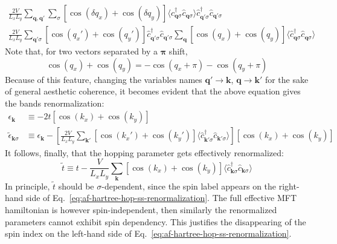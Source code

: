 \begin{multline}
	\frac{2V}{L_x L_y} \sum_{\mathbf{q}, \mathbf{q}'} \sum_\sigma \left[
		\cos \left( \delta q_x \right) + \cos \left( \delta q_y \right)	
	\right] \langle
		\hat c_{\mathbf{q}\sigma}^\dagger  \hat c_{\mathbf{q}\sigma}
	\rangle
	\hat c_{\mathbf{q}'\sigma}^\dagger  \hat c_{\mathbf{q}'\sigma} \\
	\frac{2V}{L_x L_y} \sum_{\mathbf{q}'\sigma} \left[
		\cos \left( q_x' \right) + \cos \left( q_y' \right)
	\right] \hat c_{\mathbf{q}'\sigma}^\dagger  \hat c_{\mathbf{q}'\sigma} \sum_\mathbf{q} \left[
		\cos \left( q_x \right) + \cos \left( q_y \right)
	\right] \langle
		\hat c_{\mathbf{q}\sigma}^\dagger  \hat c_{\mathbf{q}\sigma}
	\rangle
	\label{eq:reciprocal-space-non-local-interaction-fock-dd-intermediate-2}
\end{multline}
Note that, for two vectors separated by a $\bm{\pi}$ shift,
\[
	\cos \left( q_x \right) + \cos \left( q_y \right) = - \cos \left( q_x+\pi \right) - \cos \left( q_y+\pi \right)
\]
Because of this feature, changing the variables names $\mathbf{q}'\to\mathbf{k}$, $\mathbf{q}\to\mathbf{k}'$ for the sake of general aesthetic coherence, it becomes evident that the above equation gives the bands renormalization:
\[
\begin{aligned}
	\epsilon_\mathbf{k} &\equiv -2t \left[
		\cos \left( k_x \right) + \cos \left( k_y \right)
	\right] \\
	\tilde{\epsilon}_{\mathbf{k}\sigma} &\equiv \epsilon_\mathbf{k} - 
	\left[
		\frac{2V}{L_xL_y} \sum_{\mathbf{k}'} \left[
			\cos \left( k_x' \right) + \cos 	\left( k_y' \right)
		\right] \langle
		\hat c_{\mathbf{k}'\sigma}^\dagger  \hat c_{\mathbf{k}'\sigma}
		\rangle
	\right] \left[
		\cos \left( k_x \right) + \cos \left( k_y \right)
	\right]
\end{aligned}
\]
It follows, finally, that the hopping parameter gets effectively renormalized:
\begin{equation}
	\tilde{t} \equiv t - \frac{V}{L_xL_y} \sum_{\mathbf{k}} \left[
		\cos \left( k_x \right) + \cos 	\left( k_y \right)
	\right] \langle
		\hat c_{\mathbf{k}\sigma}^\dagger  \hat c_{\mathbf{k}\sigma}
	\rangle
	\label{eq:af-hartree-hop-ss-renormalization}
\end{equation}
In principle, $\tilde{t}$ should be $\sigma$-dependent, since the spin label appears on the right-hand side of Eq.~\eqref{eq:af-hartree-hop-ss-renormalization}. The full effective MFT hamiltonian is however spin-independent, {\color{tabred}then similarly the renormalized parameters cannot exhibit spin dependency. This justifies the disappearing of the spin index on the left-hand side of Eq.~\eqref{eq:af-hartree-hop-ss-renormalization}.}

